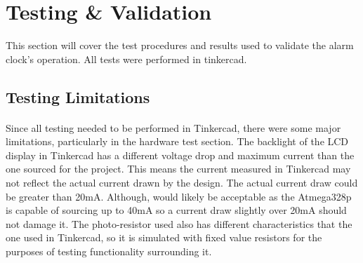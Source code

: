 \documentclass{article}
\begin{document}
\section{Testing \& Validation} %
This section will cover the test procedures and results used to validate the alarm clock's operation. All tests were performed in tinkercad.

\subsection{Testing Limitations}
\paragraph{}
Since all testing needed to be performed in Tinkercad, there were some major limitations, particularly in the hardware test section. The backlight of the LCD display in Tinkercad has a different voltage drop and maximum current than the one sourced for the project. This means the current measured in Tinkercad may not reflect the actual current drawn by the design. The actual current draw could be greater than 20mA. Although, would likely be acceptable as the Atmega328p is capable of sourcing up to 40mA\cite{atmega} so a current draw slightly over 20mA should not damage it. The photo-resistor used also has different characteristics that the one used in Tinkercad, so it is simulated with fixed value resistors for the purposes of testing functionality surrounding it.
\end{document}
